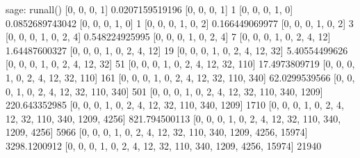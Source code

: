 sage: runall()
[0, 0, 0, 1]
0.0207159519196 [0, 0, 0, 1] 1
[0, 0, 0, 1, 0]
0.0852689743042 [0, 0, 0, 1, 0] 1
[0, 0, 0, 1, 0, 2]
0.166449069977 [0, 0, 0, 1, 0, 2] 3
[0, 0, 0, 1, 0, 2, 4]
0.548224925995 [0, 0, 0, 1, 0, 2, 4] 7
[0, 0, 0, 1, 0, 2, 4, 12]
1.64487600327 [0, 0, 0, 1, 0, 2, 4, 12] 19
[0, 0, 0, 1, 0, 2, 4, 12, 32]
5.40554499626 [0, 0, 0, 1, 0, 2, 4, 12, 32] 51
[0, 0, 0, 1, 0, 2, 4, 12, 32, 110]
17.4973809719 [0, 0, 0, 1, 0, 2, 4, 12, 32, 110] 161
[0, 0, 0, 1, 0, 2, 4, 12, 32, 110, 340]
62.0299539566 [0, 0, 0, 1, 0, 2, 4, 12, 32, 110, 340] 501
[0, 0, 0, 1, 0, 2, 4, 12, 32, 110, 340, 1209]
220.643352985 [0, 0, 0, 1, 0, 2, 4, 12, 32, 110, 340, 1209] 1710
[0, 0, 0, 1, 0, 2, 4, 12, 32, 110, 340, 1209, 4256]
821.794500113 [0, 0, 0, 1, 0, 2, 4, 12, 32, 110, 340, 1209, 4256] 5966
[0, 0, 0, 1, 0, 2, 4, 12, 32, 110, 340, 1209, 4256, 15974]
3298.1200912 [0, 0, 0, 1, 0, 2, 4, 12, 32, 110, 340, 1209, 4256, 15974] 21940
